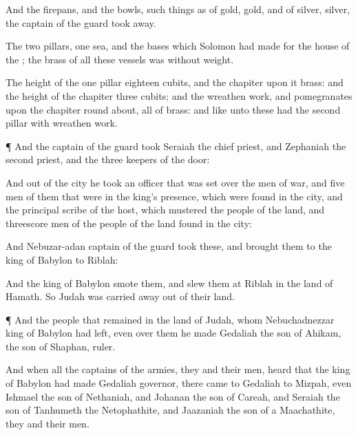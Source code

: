 {And the
firepans, and the
bowls,
{} such things as
{} of
gold,
{}
gold, and of
silver,
{}
silver, the
captain of the
guard took
away.

The
two
pillars,
one
sea, and the
bases which
Solomon had
made for the
house of the
{}; the
brass of all these
vessels was
without
weight.

The
height of the
one
pillar
{}
eighteen
cubits, and the
chapiter upon it
{}
brass: and the
height of the
chapiter
three
cubits; and the wreathen
work, and
pomegranates upon the
chapiter round
about, all of
brass: and like unto these had the
second
pillar with wreathen
work.


\par }{\PP {}¶ And the
captain of the
guard
took
Seraiah the
chief
priest, and
Zephaniah the
second
priest, and the
three
keepers of the
door:

And out of the
city he
took
an
officer that was
set over the
men of
war, and
five
men of them that
were in the
king’s
presence, which were
found in the
city, and the
principal
scribe of the
host, which
mustered the
people of the
land, and
threescore
men of the
people of the
land
{}
found in the
city:

And
Nebuzar-adan
captain of the
guard
took these, and
brought them to the
king of
Babylon to
Riblah:

And the
king of
Babylon
smote them, and
slew them at
Riblah in the
land of
Hamath. So
Judah was carried
away out of their
land.


\par }{\PP {}¶ And
{} the
people that
remained in the
land of
Judah, whom
Nebuchadnezzar
king of
Babylon had
left, even over them he made
Gedaliah the
son of
Ahikam, the
son of
Shaphan,
ruler.

And when all the
captains of the
armies, they and their
men,
heard that the
king of
Babylon had made
Gedaliah
governor, there
came to
Gedaliah to
Mizpah, even
Ishmael the
son of
Nethaniah, and
Johanan the
son of
Careah, and
Seraiah the
son of
Tanhumeth the
Netophathite, and
Jaazaniah the
son of a
Maachathite, they and their
men.

}
